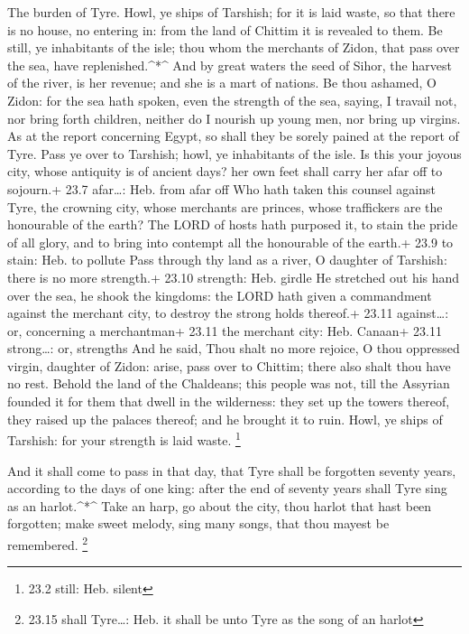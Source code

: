  The burden of Tyre. Howl, ye ships of Tarshish; for it is
laid waste, so that there is no house, no entering in: from the land of
Chittim it is revealed to them.  Be still, ye inhabitants of
the isle; thou whom the merchants of Zidon, that pass over the sea, have
replenished.\^{}*\^{}  And by great waters the seed of
Sihor, the harvest of the river, is her revenue; and she is a mart of
nations.  Be thou ashamed, O Zidon: for the sea hath spoken,
even the strength of the sea, saying, I travail not, nor bring forth
children, neither do I nourish up young men, nor bring up virgins.
 As at the report concerning Egypt, so shall they be sorely
pained at the report of Tyre.  Pass ye over to Tarshish;
howl, ye inhabitants of the isle.  Is this your joyous city,
whose antiquity is of ancient days? her own feet shall carry her afar
off to sojourn.+ 23.7 afar\ldots: Heb. from afar off  Who
hath taken this counsel against Tyre, the crowning city, whose merchants
are princes, whose traffickers are the honourable of the earth?
 The LORD of hosts hath purposed it, to stain the pride of
all glory, and to bring into contempt all the honourable of the earth.+
23.9 to stain: Heb. to pollute  Pass through thy land as a
river, O daughter of Tarshish: there is no more strength.+ 23.10
strength: Heb. girdle  He stretched out his hand over the
sea, he shook the kingdoms: the LORD hath given a commandment against
the merchant city, to destroy the strong holds thereof.+ 23.11
against\ldots: or, concerning a merchantman+ 23.11 the merchant city:
Heb. Canaan+ 23.11 strong\ldots: or, strengths  And he
said, Thou shalt no more rejoice, O thou oppressed virgin, daughter of
Zidon: arise, pass over to Chittim; there also shalt thou have no rest.
 Behold the land of the Chaldeans; this people was not,
till the Assyrian founded it for them that dwell in the wilderness: they
set up the towers thereof, they raised up the palaces thereof; and he
brought it to ruin.  Howl, ye ships of Tarshish: for your
strength is laid waste. \footnote{23.2 still: Heb. silent}

 And it shall come to pass in that day, that Tyre shall be
forgotten seventy years, according to the days of one king: after the
end of seventy years shall Tyre sing as an harlot.\^{}*\^{}
 Take an harp, go about the city, thou harlot that hast
been forgotten; make sweet melody, sing many songs, that thou mayest be
remembered. \footnote{23.15 shall Tyre\ldots: Heb. it shall be unto Tyre
  as the song of an harlot}

